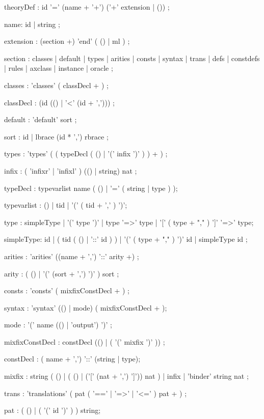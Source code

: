 \begin{rail}

theoryDef : id '=' (name + '+') ('+' extension | ())
          ;

name: id | string
    ;

extension : (section +) 'end' ( () | ml )
          ;

section : classes
        | default
        | types
        | arities
        | consts
        | syntax
        | trans
        | defs
        | constdefs
        | rules
        | axclass
        | instance
        | oracle
        ;

classes : 'classes' ( classDecl + )
        ;

classDecl : (id (() | '<' (id + ',')))
        ;

default : 'default' sort 
        ;

sort :  id
     | lbrace (id * ',') rbrace
     ;

types : 'types' ( ( typeDecl ( () | '(' infix ')' ) ) + )
      ;

infix : ( 'infixr' | 'infixl' ) (() | string) nat
      ;

typeDecl : typevarlist name
           ( () | '=' ( string | type ) );

typevarlist : () | tid | '(' ( tid + ',' ) ')';

type : simpleType | '(' type ')' | type '=>' type |
       '[' ( type + "," ) ']' '=>' type;

simpleType: id | ( tid ( () | '::' id ) ) |
            '(' ( type + "," ) ')' id | simpleType id
          ;

arities : 'arities' ((name + ',') '::' arity +)
        ;

arity : ( () | '(' (sort + ',') ')' ) sort
      ;

consts : 'consts' ( mixfixConstDecl + )
       ;

syntax : 'syntax' (() | mode) ( mixfixConstDecl + );

mode : '(' name (() | 'output') ')'
     ;

mixfixConstDecl : constDecl (() | ( '(' mixfix ')' ))
                ;

constDecl : ( name + ',') '::' (string | type);

mixfix :  string ( () | ( () | ('[' (nat + ',') ']')) nat )
       |  infix
       | 'binder' string nat ;

trans : 'translations' ( pat ( '==' | '=>' | '<=' ) pat + )
      ;

pat : ( () | ( '(' id ')' ) ) string;


\end{rail}
